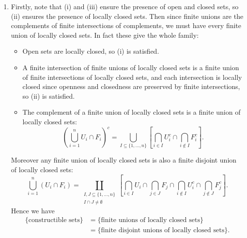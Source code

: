 \documentclass{report}
\begin{document}
\begin{enumerate}[label=\textbf{7.4.\Alph*.}]
	\item Firstly, note that (i) and (iii) ensure the presence of open and
	      closed sets, so (ii) ensures the presence of locally closed sets. Then
	      since finite unions are the complements of finite intersections of
	      complements, we must have every finite union of locally closed sets. In
	      fact these give the whole family:
	      \begin{itemize}
		      \item Open sets are locally closed, so (i) is satisfied.

		      \item A finite intersection of finite unions of locally closed sets
		            is a finite union of finite intersections of locally closed
		            sets, and each intersection is locally closed since openness and
		            closedness are preserved by finite intersections, so (ii) is
		            satisfied.

		      \item The complement of a finite union of locally closed sets is a
		            finite union of locally closed sets:
		            \begin{equation*}
			            \left(\bigcup_{i=1}^nU_i\cap F_i\right)^c
			            = \bigcup_{I\subseteq\{1,\ldots,n\}}
			            \left[\bigcap_{i\in I}U_i^c\cap\bigcap_{i\notin I}F_i^c\right].
		            \end{equation*}
	      \end{itemize}
	      Moreover any finite union of locally closed sets is also a
	      finite disjoint union of locally closed sets:
	      \begin{equation*}
		      \bigcup_{i=1}^n(U_i\cap F_i)
		      = \coprod_{\substack{I,J\subseteq\{1,\ldots,n\} \\
				      I\cap J\ne\emptyset}}\left[
			      \bigcap_{i\in I}U_i
			      \cap\bigcap_{j\in J}F_j
			      \cap\bigcap_{i\notin I}U_i^c
			      \cap\bigcap_{j\notin J}F_j^c
			      \right].
	      \end{equation*}
	      Hence we have
	      \begin{align*}
		      \{\text{constructible sets}\}
		       & = \{\text{finite unions of locally closed sets}\}           \\
		       & = \{\text{finite disjoint unions of locally closed sets}\}.
	      \end{align*}


\end{enumerate}
\end{document}
